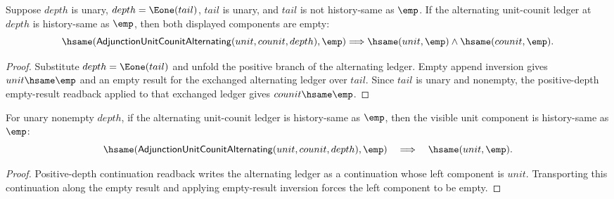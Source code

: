 \begin{theorem}
\label{thm:adjunction-unit-counit-alternating-positive-tail-result-empty-components-empty}
Suppose $depth$ is unary, $depth=\Eone(tail)$, $tail$ is unary, and
$tail$ is not history-same as $\emp$. If the alternating unit-counit ledger at
$depth$ is history-same as $\emp$, then both displayed components are empty:
$$
\hsame(\mathsf{AdjunctionUnitCounitAlternating}(unit,counit,depth),\emp)
\Longrightarrow
\hsame(unit,\emp)\land\hsame(counit,\emp).
$$
\end{theorem}
\begin{proof}
Substitute $depth=\Eone(tail)$ and unfold the positive branch of the
alternating ledger. Empty append inversion gives $unit\hsame\emp$ and an
empty result for the exchanged alternating ledger over $tail$. Since $tail$ is
unary and nonempty, the positive-depth empty-result readback applied to that
exchanged ledger gives $counit\hsame\emp$.
\end{proof}

\begin{theorem}
\label{thm:adjunction-alternating-positive-depth-result-empty-unit-empty}
For unary nonempty $depth$, if the alternating unit-counit ledger is
history-same as $\emp$, then the visible unit component is history-same as
\(\emp\):
$$
\hsame(\mathsf{AdjunctionUnitCounitAlternating}(unit,counit,depth),\emp)
\quad\Longrightarrow\quad
\hsame(unit,\emp).
$$
\end{theorem}
\begin{proof}
Positive-depth continuation readback writes the alternating ledger as a
continuation whose left component is \(unit\). Transporting this continuation
along the empty result and applying empty-result inversion forces the left
component to be empty.
\end{proof}

